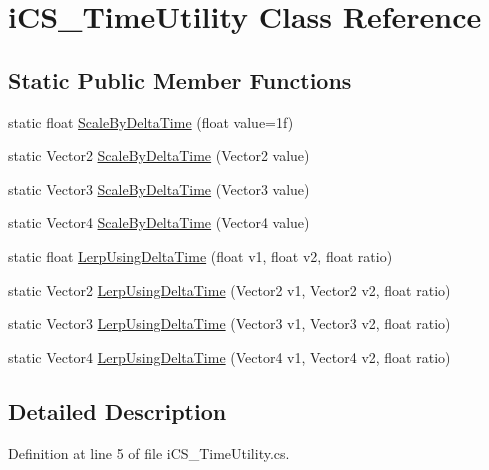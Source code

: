 \hypertarget{classi_c_s___time_utility}{\section{i\+C\+S\+\_\+\+Time\+Utility Class Reference}
\label{classi_c_s___time_utility}
}
\subsection*{Static Public Member Functions}
\begin{DoxyCompactItemize}
\item 
static float \hyperlink{classi_c_s___time_utility_aee31f9e7423159959060fbb185a94bfe}{Scale\+By\+Delta\+Time} (float value=1f)
\item 
static Vector2 \hyperlink{classi_c_s___time_utility_adc20e271bd5a31f2321d3c767140bfc7}{Scale\+By\+Delta\+Time} (Vector2 value)
\item 
static Vector3 \hyperlink{classi_c_s___time_utility_ab79b22ccdc390943c9d0bfebd1c6a06f}{Scale\+By\+Delta\+Time} (Vector3 value)
\item 
static Vector4 \hyperlink{classi_c_s___time_utility_a2d64bc71bea1d4b155cbade330152b19}{Scale\+By\+Delta\+Time} (Vector4 value)
\item 
static float \hyperlink{classi_c_s___time_utility_a880886d7c76475db0b458a2217198cbc}{Lerp\+Using\+Delta\+Time} (float v1, float v2, float ratio)
\item 
static Vector2 \hyperlink{classi_c_s___time_utility_ad89b24668bf9fa18708c33d41f89a11d}{Lerp\+Using\+Delta\+Time} (Vector2 v1, Vector2 v2, float ratio)
\item 
static Vector3 \hyperlink{classi_c_s___time_utility_a90ea122b5979cd3203bd750a0627186e}{Lerp\+Using\+Delta\+Time} (Vector3 v1, Vector3 v2, float ratio)
\item 
static Vector4 \hyperlink{classi_c_s___time_utility_aab7ac30b38519012456c94a9e2309f97}{Lerp\+Using\+Delta\+Time} (Vector4 v1, Vector4 v2, float ratio)
\end{DoxyCompactItemize}


\subsection{Detailed Description}


Definition at line 5 of file i\+C\+S\+\_\+\+Time\+Utility.\+cs.



